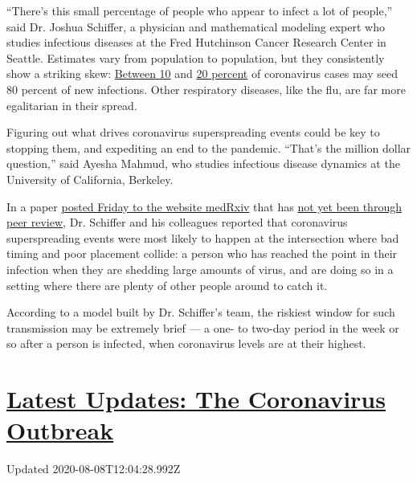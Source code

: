 ``There's this small percentage of people who appear to infect a lot of
people,'' said Dr. Joshua Schiffer, a physician and mathematical
modeling expert who studies infectious diseases at the Fred Hutchinson
Cancer Research Center in Seattle. Estimates vary from population to
population, but they consistently show a striking skew:
\href{https://wellcomeopenresearch.org/articles/5-67}{Between 10} and
\href{https://europepmc.org/article/ppr/ppr165671}{20 percent} of
coronavirus cases may seed 80 percent of new infections. Other
respiratory diseases, like the flu, are far more egalitarian in their
spread.

Figuring out what drives coronavirus superspreading events could be key
to stopping them, and expediting an end to the pandemic. ``That's the
million dollar question,'' said Ayesha Mahmud, who studies infectious
disease dynamics at the University of California, Berkeley.

In a paper
\href{https://www.medrxiv.org/content/10.1101/2020.08.07.20169920v1.full.pdf}{posted
Friday to the website medRxiv} that has
\href{https://www.nytimes.com/2020/04/14/science/coronavirus-disinformation.html}{not
yet been through peer review}, Dr. Schiffer and his colleagues reported
that coronavirus superspreading events were most likely to happen at the
intersection where bad timing and poor placement collide: a person who
has reached the point in their infection when they are shedding large
amounts of virus, and are doing so in a setting where there are plenty
of other people around to catch it.

According to a model built by Dr. Schiffer's team, the riskiest window
for such transmission may be extremely brief --- a one- to two-day
period in the week or so after a person is infected, when coronavirus
levels are at their highest.

\hypertarget{latest-updates-the-coronavirus-outbreak}{%
\section{\texorpdfstring{\href{https://www.nytimes.com/2020/08/07/world/covid-19-news.html?action=click\&pgtype=Article\&state=default\&region=MAIN_CONTENT_1\&context=storylines_live_updates}{Latest
Updates: The Coronavirus
Outbreak}}{Latest Updates: The Coronavirus Outbreak}}\label{latest-updates-the-coronavirus-outbreak}}

Updated 2020-08-08T12:04:28.992Z

